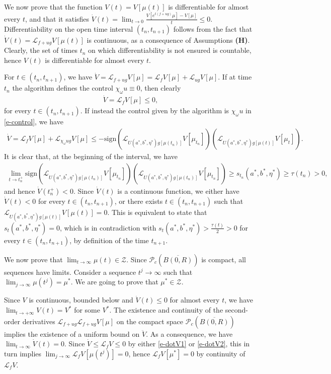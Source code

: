 \documentclass{article}
\renewcommand{\L}{\mathcal{L}}
\newcommand{\PR}{\mathcal{P}_c(\overline{B(0,R)})}
\theoremstyle{definition}\newtheorem{remark}{Remark}
\newcommand{\bqn}{\begin{eqnarray}}
\newcommand{\eqnn}{\nonumber\end{eqnarray}}
\newcommand{\eqnl}[1]{\label{#1}\end{eqnarray}}
\renewcommand{\r}[1]{\eqref{#1}}
\begin{document}
We now prove that the function $V(t)= V[\mu(t)]$ is differentiable for almost every $t$, and that it satisfies 
$\dot V(t) = \lim_{t\to 0}\frac{V[e^{t(f+ug)}\mu]-V[\mu]}{t} \leq 0$. Differentiability on the open time interval $(t_n,t_{n+1})$ follows from the fact that $\dot V(t)=\L_{f+ug}V[\mu(t)]$ is continuous, as a consequence of Assumptions {\bf (H)}. Clearly, the set of times $t_n$ on which differentiability is not ensured is countable, hence $V(t)$ is differentiable for almost every $t$.

For $t\in(t_n,t_{n+1})$, we have $\dot V=\L_{f+ug}V[\mu]=\L_fV[\mu]+\L_{ug}V[\mu]$. If at time $t_n$ the algorithm defines the control $\chi_{\omega}u\equiv 0$, then clearly 
\bqn
\dot V=\L_f V[\mu]\leq 0 ,
\eqnl{e-dotV1} 
for every $t\in(t_n,t_{n+1})$. If instead the control given by the algorithm is $\chi_\omega u$ in \r{e-control}, we have 
\bqn
\dot V=\L_f V[\mu]+\L_{\chi_\omega u g} V[\mu]\leq -\mathrm{sign}(\L_{U(a^*,b^*,\eta^*)g[\mu(t_n)]}V[\mu_{t_n}]) (\L_{U(a^*,b^*,\eta^*)g[\mu(t)]}V[\mu_{t}]).
\eqnl{e-dotV2}
It is clear that, at the beginning of the interval, we have
\bqn
\lim_{t\to t_n^+}\mathrm{sign}(\L_{U(a^*,b^*,\eta^*)g[\mu(t_n)]}V[\mu_{t_n}]) (\L_{U(a^*,b^*,\eta^*)g[\mu(t_n)]}V[\mu_{t_n}])\geq s_{t_n}(a^*,b^*,\eta^*)\geq \tau(t_n)>0,
\eqnn
and hence $\dot V(t_n^+)<0$. Since $\dot V(t)$ is a continuous function, we either have $\dot V(t)<0$ for every $t \in (t_n,t_{n+1})$, or there exists $t\in (t_n,t_{n+1})$ such that $\L_{U(a^*,b^*,\eta^*)g[\mu(t)]}V[\mu(t)]=0$. This is equivalent to state that $s_t(a^*,b^*,\eta^*)=0$, which is in contradiction with $s_t(a^*,b^*,\eta^*)>\frac{\tau(t)}2>0$ for every $t\in (t_n,t_{n+1})$, by definition of the time $t_{n+1}$.

We now prove that $\lim_{t\to \infty}\mu(t)\in \mathcal{Z}$. Since $\PR$ is compact, all sequences have limits. Consider a sequence $t^j\to\infty$ such that $\lim_{j\to\infty}\mu(t^j)=\mu^*$. We are going to prove that $\mu^*\in \mathcal{Z}$.

Since $V$ is continuous, bounded below and $\dot V(t)\leq 0$ for almost every $t$, we have $\lim_{t\to +\infty} V(t)=V^*$ for some $V^*$. The existence and continuity of the second-order derivatives $\L_{f+ug}\L_{f+ug}V[\mu]$ on the compact space $\PR$ implies the existence of a uniform bound on $\ddot V$. As a consequence, we have $\lim_{t\to\infty}\dot V(t)=0$. Since $\dot V\leq \L_f V\leq 0$ by either \r{e-dotV1} or \r{e-dotV2}, this in turn implies $\lim_{j\to\infty} \L_f V[\mu(t^j)]=0$, hence $\L_fV[\mu^*]=0$ by continuity of $\L_fV$.
\end{document}
